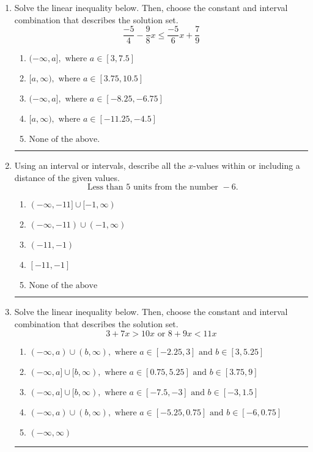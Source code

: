 \documentclass[14pt]{extbook}
\newcommand{\litem}[1]{\item#1\hspace*{-1cm}\rule{\textwidth}{0.4pt}}
\begin{document}
\begin{enumerate}
\litem{
Solve the linear inequality below. Then, choose the constant and interval combination that describes the solution set.\[ \frac{-5}{4} - \frac{9}{8} x \leq \frac{-5}{6} x + \frac{7}{9} \]\begin{enumerate}[label=\Alph*.]
\item \( (-\infty, a], \text{ where } a \in [3, 7.5] \)
\item \( [a, \infty), \text{ where } a \in [3.75, 10.5] \)
\item \( (-\infty, a], \text{ where } a \in [-8.25, -6.75] \)
\item \( [a, \infty), \text{ where } a \in [-11.25, -4.5] \)
\item \( \text{None of the above}. \)

\end{enumerate} }
\litem{
Using an interval or intervals, describe all the $x$-values within or including a distance of the given values.\[ \text{ Less than } 5 \text{ units from the number } -6. \]\begin{enumerate}[label=\Alph*.]
\item \( (-\infty, -11] \cup [-1, \infty) \)
\item \( (-\infty, -11) \cup (-1, \infty) \)
\item \( (-11, -1) \)
\item \( [-11, -1] \)
\item \( \text{None of the above} \)

\end{enumerate} }
\litem{
Solve the linear inequality below. Then, choose the constant and interval combination that describes the solution set.\[ 3 + 7 x > 10 x \text{ or } 8 + 9 x < 11 x \]\begin{enumerate}[label=\Alph*.]
\item \( (-\infty, a) \cup (b, \infty), \text{ where } a \in [-2.25, 3] \text{ and } b \in [3, 5.25] \)
\item \( (-\infty, a] \cup [b, \infty), \text{ where } a \in [0.75, 5.25] \text{ and } b \in [3.75, 9] \)
\item \( (-\infty, a] \cup [b, \infty), \text{ where } a \in [-7.5, -3] \text{ and } b \in [-3, 1.5] \)
\item \( (-\infty, a) \cup (b, \infty), \text{ where } a \in [-5.25, 0.75] \text{ and } b \in [-6, 0.75] \)
\item \( (-\infty, \infty) \)


\end{enumerate}}
\end{enumerate}
\end{document}
